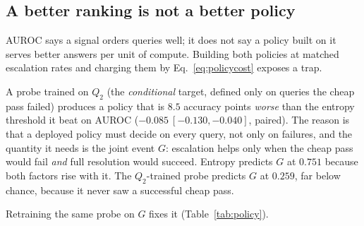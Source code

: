 \documentclass[10pt,twocolumn]{article}
\theoremstyle{plain}
\begin{document}
\subsection{A better ranking is not a better policy}
\label{sec:policy}

AUROC says a signal orders queries well; it does not say a policy built on it
serves better answers per unit of compute. Building both policies at matched
escalation rates and charging them by Eq.~\ref{eq:policycost} exposes a trap.

A probe trained on $Q_2$ (the \emph{conditional} target, defined only on queries the cheap pass failed) produces a policy that is $8.5$ accuracy points
\emph{worse} than the entropy threshold it beat on AUROC
($-0.085\ [-0.130,-0.040]$, paired). The reason is that a deployed policy must
decide on every query, not only on failures, and the quantity it needs is the
joint event $G$: escalation helps only when the cheap pass would fail
\emph{and} full resolution would succeed. Entropy predicts $G$ at $0.751$
because both factors rise with it. The $Q_2$-trained probe predicts $G$ at
$0.259$, far below chance, because it never saw a successful cheap pass.

Retraining the same probe on $G$ fixes it (Table~\ref{tab:policy}).

\begin{table}[t]
\centering\small
{}
\caption{End-to-end policy comparison on the held-out fold, latency in
milliseconds. Against the entropy threshold, the joint-target probe differs in
accuracy by $+0.030\ [-0.005, 0.070]$, indistinguishable, and in latency by
$-27.8\ [-40.7, -15.0]$\,ms, a significant $15\%$ saving.}
\label{tab:policy}
\end{table}
\end{document}
